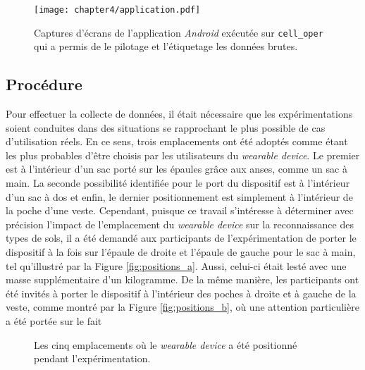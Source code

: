 \begin{figure}[H]
	\centering
	\texttt{[image: chapter4/application.pdf]}
        \caption{Captures d'écrans de l'application \textit{Android} exécutée sur \texttt{cell\_oper} qui a permis de le pilotage et l'étiquetage les données brutes.}
	\label{fig:application}
\end{figure}

\subsection{Procédure}
Pour effectuer la collecte de données, il était nécessaire que les expérimentations soient conduites dans des situations se rapprochant le plus possible de cas d'utilisation réels. En ce sens, trois emplacements ont été adoptés comme étant les plus probables d'être choisis par les utilisateurs du \textit{wearable device}. Le premier est à l'intérieur d'un sac porté sur les épaules grâce aux anses, comme un sac à main. La seconde possibilité identifiée pour le port du dispositif est à l'intérieur d'un sac à dos et enfin, le dernier positionnement est simplement à l'intérieur de la poche d'une veste. Cependant, puisque ce travail s'intéresse à déterminer avec précision l'impact de l'emplacement du \textit{wearable device} sur la reconnaissance des types de sols, il a été demandé aux participants de l'expérimentation de porter le dispositif à la fois sur l'épaule de droite et l'épaule de gauche pour le sac à main, tel qu'illustré par la Figure \ref{fig:positions_a}. Aussi, celui-ci était lesté avec une masse supplémentaire d'un kilogramme. De la même manière, les participants ont été invités à porter le dispositif à l'intérieur des poches à droite et à gauche de la veste, comme montré par la Figure \ref{fig:positions_b}, où une attention particulière a été portée sur le fait

\begin{figure}[H]
	\centering
	\hspace*{\fill}
    \caption{Les cinq emplacements où le \textit{wearable device} a été positionné pendant l'expérimentation.}
    \label{fig:positions}
\end{figure}

